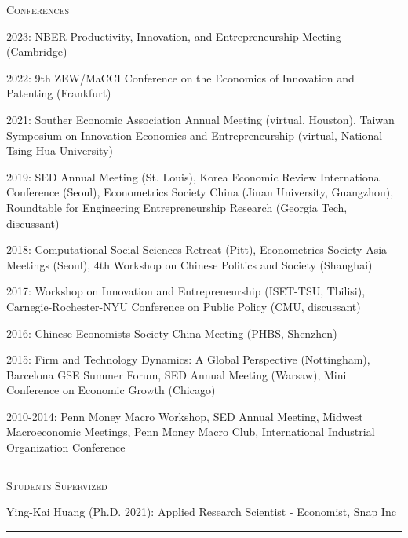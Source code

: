 \documentclass{article}
\begin{document}
\parbox{\textwidth}{
\parbox[t]{0.28\textwidth}{ \raggedright \noindent \textsc{ Conferences } }
\parbox[t]{0.72\textwidth}{ \raggedright

2023: NBER Productivity, Innovation, and Entrepreneurship Meeting (Cambridge)
\vspace{0.27cm}

2022: 9th ZEW/MaCCI Conference on the Economics of Innovation and Patenting (Frankfurt)
\vspace{0.27cm}

2021: Souther Economic Association Annual Meeting (virtual, Houston), Taiwan Symposium on Innovation Economics and Entrepreneurship (virtual, National Tsing Hua University)
\vspace{0.27cm}

2019: SED Annual Meeting (St. Louis), Korea Economic Review International Conference (Seoul), Econometrics Society China (Jinan University, Guangzhou), Roundtable for Engineering Entrepreneurship Research (Georgia Tech, discussant)
\vspace{0.27cm}

2018: Computational Social Sciences Retreat (Pitt), Econometrics Society Asia Meetings (Seoul), 4th Workshop on Chinese Politics and Society (Shanghai)
\vspace{0.27cm}

2017: Workshop on Innovation and Entrepreneurship (ISET-TSU, Tbilisi), Carnegie-Rochester-NYU Conference on Public Policy (CMU, discussant)
\vspace{0.27cm}

2016: Chinese Economists Society China Meeting (PHBS, Shenzhen)
\vspace{0.27cm}

2015: Firm and Technology Dynamics: A Global Perspective (Nottingham), Barcelona GSE Summer Forum, SED Annual Meeting (Warsaw), Mini Conference on Economic Growth (Chicago)
\vspace{0.27cm}

2010-2014: Penn Money Macro Workshop, SED Annual Meeting, Midwest Macroeconomic Meetings, Penn Money Macro Club, International Industrial Organization Conference
\vspace{0.27cm}

}
\textcolor{light-gray}{\hrule}
}
\vspace{0.3cm}

\parbox{\textwidth}{
\parbox[t]{0.28\textwidth}{ \raggedright \noindent \textsc{ Students Supervized } }
\parbox[t]{0.72\textwidth}{ \raggedright

Ying-Kai Huang (Ph.D. 2021): Applied Research Scientist - Economist, Snap Inc
\vspace{0.27cm}

}
\textcolor{light-gray}{\hrule}
}
\vspace{0.3cm}
\end{document}
